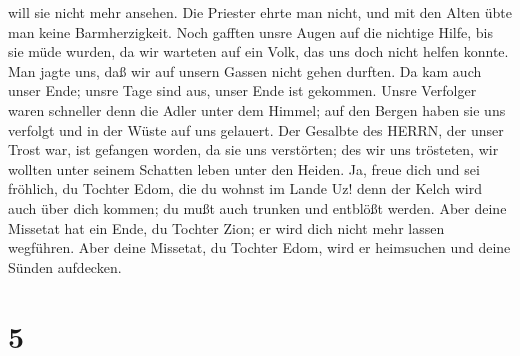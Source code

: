 will sie nicht mehr ansehen. Die Priester ehrte man nicht, und mit den
Alten übte man keine Barmherzigkeit.  Noch gafften unsre
Augen auf die nichtige Hilfe, bis sie müde wurden, da wir warteten auf
ein Volk, das uns doch nicht helfen konnte.  Man jagte uns,
daß wir auf unsern Gassen nicht gehen durften. Da kam auch unser Ende;
unsre Tage sind aus, unser Ende ist gekommen.  Unsre
Verfolger waren schneller denn die Adler unter dem Himmel; auf den
Bergen haben sie uns verfolgt und in der Wüste auf uns gelauert.
 Der Gesalbte des HERRN, der unser Trost war, ist gefangen
worden, da sie uns verstörten; des wir uns trösteten, wir wollten unter
seinem Schatten leben unter den Heiden.  Ja, freue dich und
sei fröhlich, du Tochter Edom, die du wohnst im Lande Uz! denn der Kelch
wird auch über dich kommen; du mußt auch trunken und entblößt werden.
 Aber deine Missetat hat ein Ende, du Tochter Zion; er wird
dich nicht mehr lassen wegführen. Aber deine Missetat, du Tochter Edom,
wird er heimsuchen und deine Sünden aufdecken.

\hypertarget{section-4}{%
\section{5}\label{section-4}}

